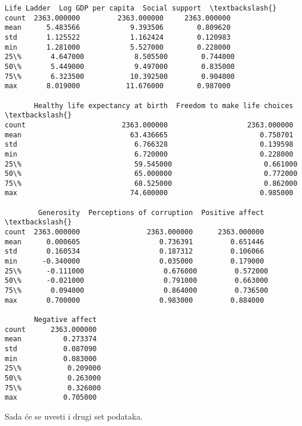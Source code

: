 \documentclass[11pt]{article}
\makeatletter
\newcommand{\boxspacing}{\kern\kvtcb@left@rule\kern\kvtcb@boxsep}
\newcommand{\prompt}[4]{
        {\ttfamily\llap{{\color{#2}[#3]:\hspace{3pt}#4}}\vspace{-\baselineskip}}
    }
\makeatother
\begin{document}
            \begin{tcolorbox}[breakable, size=fbox, boxrule=.5pt, pad at break*=1mm, opacityfill=0]
\prompt{Out}{outcolor}{27}{\boxspacing}
\begin{Verbatim}[commandchars=\\\{\}]
       Life Ladder  Log GDP per capita  Social support  \textbackslash{}
count  2363.000000         2363.000000     2363.000000
mean      5.483566            9.393506        0.809620
std       1.125522            1.162424        0.120983
min       1.281000            5.527000        0.228000
25\%       4.647000            8.505500        0.744000
50\%       5.449000            9.497000        0.835000
75\%       6.323500           10.392500        0.904000
max       8.019000           11.676000        0.987000

       Healthy life expectancy at birth  Freedom to make life choices  \textbackslash{}
count                       2363.000000                   2363.000000
mean                          63.436665                      0.750701
std                            6.766328                      0.139598
min                            6.720000                      0.228000
25\%                           59.545000                      0.661000
50\%                           65.000000                      0.772000
75\%                           68.525000                      0.862000
max                           74.600000                      0.985000

        Generosity  Perceptions of corruption  Positive affect  \textbackslash{}
count  2363.000000                2363.000000      2363.000000
mean      0.000605                   0.736391         0.651446
std       0.160534                   0.187312         0.106066
min      -0.340000                   0.035000         0.179000
25\%      -0.111000                   0.676000         0.572000
50\%      -0.021000                   0.791000         0.663000
75\%       0.094000                   0.864000         0.736500
max       0.700000                   0.983000         0.884000

       Negative affect
count      2363.000000
mean          0.273374
std           0.087090
min           0.083000
25\%           0.209000
50\%           0.263000
75\%           0.326000
max           0.705000
\end{Verbatim}
\end{tcolorbox}
        
    Sada će se uvesti i drugi set podataka.
\end{document}
